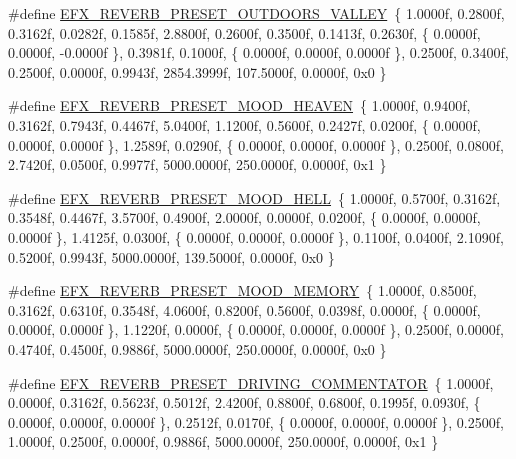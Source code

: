 \begin{DoxyCompactItemize}
\item 
\#define \hyperlink{efx-presets_8h_afb3c0613ee957fd34d407431712c9526}{E\+F\+X\+\_\+\+R\+E\+V\+E\+R\+B\+\_\+\+P\+R\+E\+S\+E\+T\+\_\+\+O\+U\+T\+D\+O\+O\+R\+S\+\_\+\+V\+A\+L\+L\+EY}~\{ 1.\+0000f, 0.\+2800f, 0.\+3162f, 0.\+0282f, 0.\+1585f, 2.\+8800f, 0.\+2600f, 0.\+3500f, 0.\+1413f, 0.\+2630f, \{ 0.\+0000f, 0.\+0000f, -\/0.\+0000f \}, 0.\+3981f, 0.\+1000f, \{ 0.\+0000f, 0.\+0000f, 0.\+0000f \}, 0.\+2500f, 0.\+3400f, 0.\+2500f, 0.\+0000f, 0.\+9943f, 2854.\+3999f, 107.\+5000f, 0.\+0000f, 0x0 \}
\item 
\#define \hyperlink{efx-presets_8h_a57bd7019d4f82fc9cbc1e9e1796c7bff}{E\+F\+X\+\_\+\+R\+E\+V\+E\+R\+B\+\_\+\+P\+R\+E\+S\+E\+T\+\_\+\+M\+O\+O\+D\+\_\+\+H\+E\+A\+V\+EN}~\{ 1.\+0000f, 0.\+9400f, 0.\+3162f, 0.\+7943f, 0.\+4467f, 5.\+0400f, 1.\+1200f, 0.\+5600f, 0.\+2427f, 0.\+0200f, \{ 0.\+0000f, 0.\+0000f, 0.\+0000f \}, 1.\+2589f, 0.\+0290f, \{ 0.\+0000f, 0.\+0000f, 0.\+0000f \}, 0.\+2500f, 0.\+0800f, 2.\+7420f, 0.\+0500f, 0.\+9977f, 5000.\+0000f, 250.\+0000f, 0.\+0000f, 0x1 \}
\item 
\#define \hyperlink{efx-presets_8h_accdcedee2b00834ee55cd5a557a37eba}{E\+F\+X\+\_\+\+R\+E\+V\+E\+R\+B\+\_\+\+P\+R\+E\+S\+E\+T\+\_\+\+M\+O\+O\+D\+\_\+\+H\+E\+LL}~\{ 1.\+0000f, 0.\+5700f, 0.\+3162f, 0.\+3548f, 0.\+4467f, 3.\+5700f, 0.\+4900f, 2.\+0000f, 0.\+0000f, 0.\+0200f, \{ 0.\+0000f, 0.\+0000f, 0.\+0000f \}, 1.\+4125f, 0.\+0300f, \{ 0.\+0000f, 0.\+0000f, 0.\+0000f \}, 0.\+1100f, 0.\+0400f, 2.\+1090f, 0.\+5200f, 0.\+9943f, 5000.\+0000f, 139.\+5000f, 0.\+0000f, 0x0 \}
\item 
\#define \hyperlink{efx-presets_8h_a1ba43992b2442a1acc119886f320cdaa}{E\+F\+X\+\_\+\+R\+E\+V\+E\+R\+B\+\_\+\+P\+R\+E\+S\+E\+T\+\_\+\+M\+O\+O\+D\+\_\+\+M\+E\+M\+O\+RY}~\{ 1.\+0000f, 0.\+8500f, 0.\+3162f, 0.\+6310f, 0.\+3548f, 4.\+0600f, 0.\+8200f, 0.\+5600f, 0.\+0398f, 0.\+0000f, \{ 0.\+0000f, 0.\+0000f, 0.\+0000f \}, 1.\+1220f, 0.\+0000f, \{ 0.\+0000f, 0.\+0000f, 0.\+0000f \}, 0.\+2500f, 0.\+0000f, 0.\+4740f, 0.\+4500f, 0.\+9886f, 5000.\+0000f, 250.\+0000f, 0.\+0000f, 0x0 \}
\item 
\#define \hyperlink{efx-presets_8h_a77cd5d3ce31ec580e5b77b3fa69cc79a}{E\+F\+X\+\_\+\+R\+E\+V\+E\+R\+B\+\_\+\+P\+R\+E\+S\+E\+T\+\_\+\+D\+R\+I\+V\+I\+N\+G\+\_\+\+C\+O\+M\+M\+E\+N\+T\+A\+T\+OR}~\{ 1.\+0000f, 0.\+0000f, 0.\+3162f, 0.\+5623f, 0.\+5012f, 2.\+4200f, 0.\+8800f, 0.\+6800f, 0.\+1995f, 0.\+0930f, \{ 0.\+0000f, 0.\+0000f, 0.\+0000f \}, 0.\+2512f, 0.\+0170f, \{ 0.\+0000f, 0.\+0000f, 0.\+0000f \}, 0.\+2500f, 1.\+0000f, 0.\+2500f, 0.\+0000f, 0.\+9886f, 5000.\+0000f, 250.\+0000f, 0.\+0000f, 0x1 \}

\end{DoxyCompactItemize}
